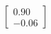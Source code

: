 \documentclass[preview]{standalone}
\begin{document}
\begin{align*}
\begin{bmatrix} 0.90 \\ -0.06 \end{bmatrix}
\end{align*}
\end{document}
